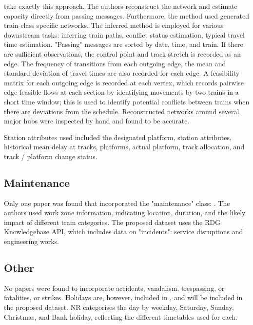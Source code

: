 \documentclass{article}
\begin{document}
\cite{nair_et_al_2019} take exactly this approach. The authors reconstruct the network and estimate capacity directly from passing messages. Furthermore, the method used generated train-class specific networks. The inferred method is employed for various downstream tasks: inferring train paths, conflict status estimation, typical travel time estimation. "Passing" messages are sorted by date, time, and train. If there are sufficient observations, the control point and track stretch is recorded as an edge. The frequency of transitions from each outgoing edge, the mean and standard deviation of travel times are also recorded for each edge. A feasibility matrix for each outgoing edge is recorded at each vertex, which records pairwise edge feasible flows at each section by identifying movements by two trains in a short time window; this is used to identify potential conflicts between trains when there are deviations from the schedule. Reconstructed networks around several major hubs were inspected by hand and found to be accurate. 

Station attributes used included the designated platform, station attributes, historical mean delay at tracks, platforms, actual platform, track allocation, and track / platform change status.


\subsection{Maintenance}

Only one paper was found that incorporated the "maintenance" class: \cite{nair_et_al_2019}. The authors used work zone information, indicating location, duration, and the likely impact of different train categories.
The proposed dataset uses the RDG Knowledgebase API, which includes data on "incidents": service disruptions and engineering works.


\subsection{Other}

No papers were found to incorporate accidents, vandalism, trespassing, or fatalities, or strikes. Holidays are, however, included in \cite{nair_et_al_2019}, and will be included in the proposed dataset. NR categorises the day by weekday, Saturday, Sunday, Christmas, and Bank holiday, reflecting the different timetables used for each.
\end{document}
